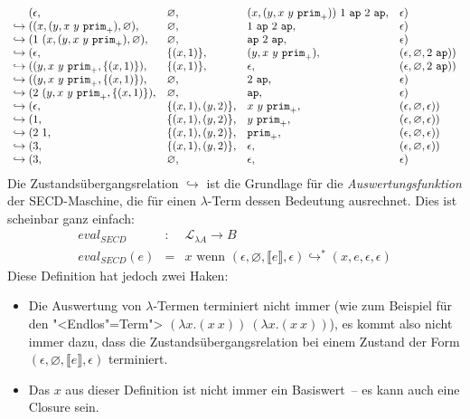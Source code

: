 \begin{displaymath}
  \begin{array}{l@{}llll}
&(\epsilon, &\varnothing, &(x, (y, x~y~\mathtt{prim}_+))~1~\mathtt{ap}~2~\mathtt{ap}, &\epsilon)\\
\hookrightarrow{}&((x, (y, x~y~\mathtt{prim}_+), \varnothing), &\varnothing, &1~\mathtt{ap}~2~\mathtt{ap}, &\epsilon)\\
\hookrightarrow{}&(1~(x, (y, x~y~\mathtt{prim}_+), \varnothing), &\varnothing, &\mathtt{ap}~2~\mathtt{ap}, &\epsilon)\\
\hookrightarrow{}&(\epsilon, &\{(x, 1)\}, &(y, x~y~\mathtt{prim}_+), &(\epsilon, \varnothing, 2~\mathtt{ap}))\\
\hookrightarrow{}&((y, x~y~\mathtt{prim}_+, \{(x, 1)\}), &\{(x, 1)\}, &\epsilon, &(\epsilon, \varnothing, 2~\mathtt{ap}))\\
\hookrightarrow{}&((y, x~y~\mathtt{prim}_+, \{(x, 1)\}), &\varnothing, &2~\mathtt{ap}, &\epsilon)\\
\hookrightarrow{}&(2~(y, x~y~\mathtt{prim}_+, \{(x, 1)\}), &\varnothing, &\mathtt{ap}, &\epsilon)\\
\hookrightarrow{}&(\epsilon, &\{(x, 1), (y, 2)\}, &x~y~\mathtt{prim}_+, &(\epsilon, \varnothing, \epsilon))\\
\hookrightarrow{}&(1, &\{(x, 1), (y, 2)\}, &y~\mathtt{prim}_+, &(\epsilon, \varnothing, \epsilon))\\
\hookrightarrow{}&(2~1, &\{(x, 1), (y, 2)\}, &\mathtt{prim}_+, &(\epsilon, \varnothing, \epsilon))\\
\hookrightarrow{}&(3, &\{(x, 1), (y, 2)\}, &\epsilon, &(\epsilon, \varnothing, \epsilon))\\
\hookrightarrow{}&(3, &\varnothing, &\epsilon, &\epsilon)
  \end{array}
\end{displaymath}
%
Die Zustandsübergangsrelation $\hookrightarrow$ ist die Grundlage
für die \textit{Auswertungsfunktion} der
SECD-Maschine, die für einen $\lambda$-Term dessen Bedeutung
ausrechnet.  Dies ist scheinbar ganz einfach:
%
\begin{eqnarray*}
  \mathit{eval}_\mathit{SECD} & : & \mathcal{L}_{\lambda{}A} \rightarrow B\\
  \mathit{eval}_\mathit{SECD}(e) &= & x \textrm{ wenn } (\epsilon, \varnothing, \llbracket e\rrbracket, \epsilon)
    \hookrightarrow^* (x, e, \epsilon, \epsilon)
\end{eqnarray*}
%
Diese Definition hat jedoch zwei Haken:
%
\begin{itemize}
\item Die Auswertung von $\lambda$-Termen terminiert nicht immer (wie
  zum Beispiel für den "<Endlos"=Term"> $(\lambda x.(x~x))~(\lambda x.(x~x))$), es kommt
  also nicht immer dazu, dass die Zustandsübergangsrelation bei einem
  Zustand der Form $(\epsilon, \varnothing, \llbracket e\rrbracket,
  \epsilon)$ terminiert.
\item Das $x$ aus dieser Definition ist nicht immer ein Basiswert~--
  es kann auch eine Closure sein.
\end{itemize}
